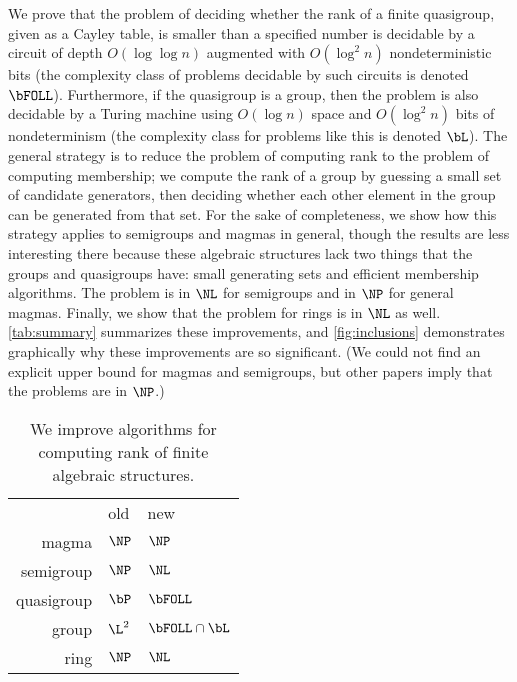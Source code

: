 \documentclass{article}
\begin{document}
%
We prove that the problem of deciding whether the rank of a finite quasigroup, given as a Cayley table, is smaller than a specified number is decidable by a circuit of depth $O(\log \log n)$ augmented with $O(\log^2 n)$ nondeterministic bits (the complexity class of problems decidable by such circuits is denoted $\bFOLL$).
Furthermore, if the quasigroup is a group, then the problem is also decidable by a Turing machine using $O(\log n)$ space and $O(\log^2 n)$ bits of nondeterminism (the complexity class for problems like this is denoted $\bL$).
The general strategy is to reduce the problem of computing rank to the problem of computing membership; we compute the rank of a group by guessing a small set of candidate generators, then deciding whether each other element in the group can be generated from that set.
For the sake of completeness, we show how this strategy applies to semigroups and magmas in general, though the results are less interesting there because these algebraic structures lack two things that the groups and quasigroups have: small generating sets and efficient membership algorithms.
The problem is in $\NL$ for semigroups and in $\NP$ for general magmas.
Finally, we show that the problem for rings is in $\NL$ as well.
\autoref{tab:summary} summarizes these improvements, and \autoref{fig:inclusions} demonstrates graphically why these improvements are so significant.
(We could not find an explicit upper bound for magmas and semigroups, but other papers imply that the problems are in $\NP$.)
\begin{table}
  \caption{\label{tab:summary}We improve algorithms for computing rank of finite algebraic structures.}
  \begin{center}
    \begin{tabular}{r l l}
      & old & new \\[5pt]
      magma & $\NP$ & $\NP$ \\
      semigroup & $\NP$ & $\NL$ \\
      quasigroup & $\bP$ \autocite{py96} & $\bFOLL$ \\
      group & $\L^2$ \autocite{lsz77} & $\bFOLL \cap \bL$ \\
      ring & $\NP$ & $\NL$
    \end{tabular}
  \end{center}
\end{table}
\end{document}
